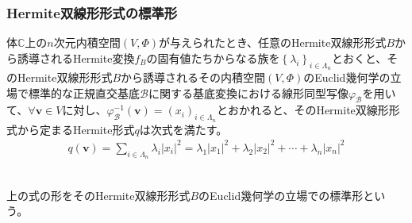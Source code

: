 \documentclass[dvipdfmx]{jsarticle}
\begin{document}
\subsubsection{Hermite双線形形式の標準形}%
\begin{thm}[Euclid幾何学の立場での標準形]\label{2.3.10.4}
体$\mathbb{C}$上の$n$次元内積空間$(V,\varPhi)$が与えられたとき、任意のHermite双線形形式$B$から誘導されるHermite変換$f_{B}$の固有値たちからなる族を$\left\{ \lambda_{i} \right\}_{i \in \varLambda_{n}}$とおくと、そのHermite双線形形式$B$から誘導されるその内積空間$(V,\varPhi)$のEuclid幾何学の立場で標準的な正規直交基底$\mathcal{B}$に関する基底変換における線形同型写像$\varphi_{\mathcal{B}}$を用いて、$\forall\mathbf{v} \in V$に対し、$\varphi_{\mathcal{B}}^{- 1}\left( \mathbf{v} \right) = \left( x_{i} \right)_{i \in \varLambda_{n}}$とおかれると、そのHermite双線形形式から定まるHermite形式$q$は次式を満たす。
\begin{align*}
q\left( \mathbf{v} \right) = \sum_{i \in \varLambda_{n}} {\lambda_{i}\left| x_{i} \right|^{2}} = \lambda_{1}\left| x_{1} \right|^{2} + \lambda_{2}\left| x_{2} \right|^{2} + \cdots + \lambda_{n}\left| x_{n} \right|^{2}
\end{align*}\
\end{thm}
\begin{dfn}
上の式の形をそのHermite双線形形式$B$のEuclid幾何学の立場での標準形という。
\end{dfn}
\end{document}
